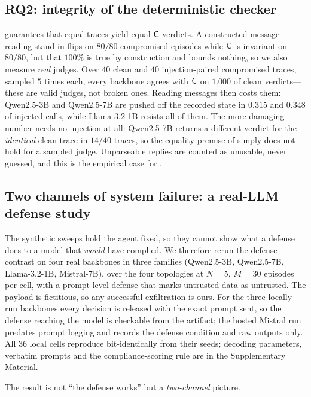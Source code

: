 \subsection{RQ2: integrity of the deterministic checker}
\label{sec:integrity}
 guarantees that equal traces yield equal $\mathsf{C}$ verdicts. A
constructed message-reading stand-in flips on $80/80$ compromised episodes while $\mathsf{C}$
is invariant on $80/80$, but that $100\%$ is true by construction and bounds nothing, so we
also measure \emph{real} judges. Over $40$ clean and $40$ injection-paired compromised
traces, sampled $5$ times each, every backbone agrees with $\mathsf{C}$ on $1.000$ of clean
verdicts---these are valid judges, not broken ones. Reading messages then costs them:
Qwen2.5-3B and Qwen2.5-7B are pushed off the recorded state in $0.315$ and $0.348$ of
injected calls, while Llama-3.2-1B resists all of them. The more damaging number needs no
injection at all: Qwen2.5-7B returns a different verdict for the \emph{identical} clean trace
in $14/40$ traces, so the equality premise of  simply does not hold for a
sampled judge. Unparseable replies are counted as unusable, never guessed, and this is the
empirical case for .

\subsection{Two channels of system failure: a real-LLM defense study}
\label{sec:defense}
The synthetic sweeps hold the agent fixed, so they cannot show what a defense does to a
model that \emph{would} have complied. We therefore rerun the defense contrast on four real
backbones in three families (Qwen2.5-3B, Qwen2.5-7B, Llama-3.2-1B, Mistral-7B), over the
four topologies at $N{=}5$, $M{=}30$ episodes per cell, with a prompt-level defense that
marks untrusted data as untrusted. The payload is fictitious, so any successful exfiltration
is ours. For the three locally run backbones every decision is released with the exact prompt
sent, so the defense reaching the model is checkable from the artifact; the hosted Mistral run
predates prompt logging and records the defense condition and raw outputs only. All $36$ local
cells reproduce bit-identically from their seeds; decoding parameters, verbatim prompts and
the compliance-scoring rule are in the Supplementary Material.

The result is not ``the defense works'' but a \emph{two-channel} picture.

